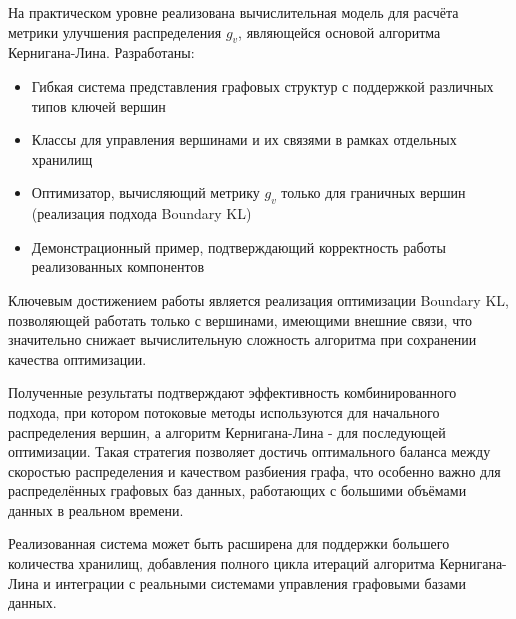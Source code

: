 \documentclass[a4paper, 14pt]{extarticle}
\begin{document}
На практическом уровне реализована вычислительная модель для расчёта метрики улучшения распределения $g_v$, являющейся основой алгоритма Кернигана-Лина. Разработаны:
\begin{itemize}
    \item Гибкая система представления графовых структур с поддержкой различных типов ключей вершин
    \item Классы для управления вершинами и их связями в рамках отдельных хранилищ
    \item Оптимизатор, вычисляющий метрику $g_v$ только для граничных вершин (реализация подхода Boundary KL)
    \item Демонстрационный пример, подтверждающий корректность работы реализованных компонентов
\end{itemize}

Ключевым достижением работы является реализация оптимизации Boundary KL, позволяющей работать только с вершинами, имеющими внешние связи, что значительно снижает вычислительную сложность алгоритма при сохранении качества оптимизации.

Полученные результаты подтверждают эффективность комбинированного подхода, при котором потоковые методы используются для начального распределения вершин, а алгоритм Кернигана-Лина - для последующей оптимизации. Такая стратегия позволяет достичь оптимального баланса между скоростью распределения и качеством разбиения графа, что особенно важно для распределённых графовых баз данных, работающих с большими объёмами данных в реальном времени.

Реализованная система может быть расширена для поддержки большего количества хранилищ, добавления полного цикла итераций алгоритма Кернигана-Лина и интеграции с реальными системами управления графовыми базами данных.
\newpage

\newpage

\end{document}
